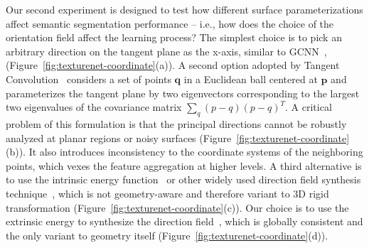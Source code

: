 Our second experiment is designed to test how different surface parameterizations affect semantic segmentation performance -- i.e., how does the choice of the orientation field affect the learning process?   The simplest choice is to pick an arbitrary direction on the tangent plane as the x-axis, similar to GCNN~\cite{masci2015geodesic}, (Figure~\ref{fig:texturenet-coordinate}(a)).  A second option adopted by Tangent Convolution~\cite{tatarchenko2018tangent} considers a set of points $\mathbf{q}$ in a Euclidean ball centered at $\mathbf{p}$ and parameterizes the tangent plane by two eigenvectors corresponding to the largest two eigenvalues of the covariance matrix $\sum_{q}(p-q)(p-q)^T$.  A critical problem of this formulation is that the principal directions cannot be robustly analyzed at planar regions or noisy surfaces (Figure~\ref{fig:texturenet-coordinate}(b)). It also introduces inconsistency to the coordinate systems of the neighboring points, which vexes the feature aggregation at higher levels.  A third alternative is to use the intrinsic energy function~\cite{jakob2015instant} or other widely used direction field synthesis technique~\cite{ray2008n,lai2010metric}, which is not geometry-aware and therefore variant to 3D rigid transformation (Figure~\ref{fig:texturenet-coordinate}(c)). Our choice is to use the extrinsic energy to synthesize the direction field~\cite{huang2018quadriflow,jakob2015instant}, which is globally consistent and the only variant to geometry itself (Figure~\ref{fig:texturenet-coordinate}(d)).

